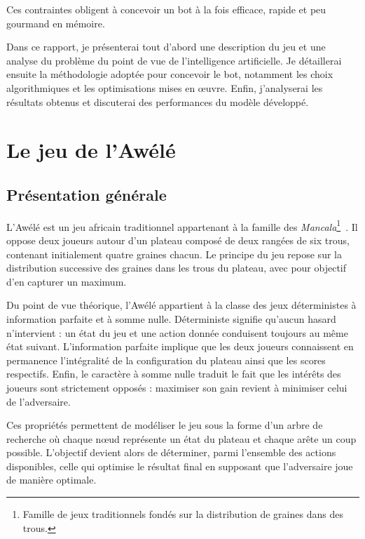 \documentclass[11pt,a4paper]{article}
\begin{document}
Ces contraintes obligent à concevoir un bot à la fois efficace, rapide et peu gourmand en mémoire.

Dans ce rapport, je présenterai tout d'abord une description du jeu et une analyse du problème du point de vue de l'intelligence 
artificielle. Je détaillerai ensuite la méthodologie adoptée pour concevoir le bot, notamment les choix algorithmiques et les optimisations
mises en œuvre. Enfin, j'analyserai les résultats obtenus et discuterai des performances du modèle développé.


\section{Le jeu de l'Awélé}

\subsection{Présentation générale}

L'Awélé est un jeu africain traditionnel appartenant à la famille des \textit{Mancala}\footnote{Famille de jeux traditionnels 
fondés sur la distribution de graines dans des trous.}~\cite{WikiOware}. Il oppose deux joueurs autour d'un plateau composé de deux rangées de six
trous, contenant initialement quatre graines chacun. Le principe du jeu repose sur la distribution successive des graines dans
les trous du plateau, avec pour objectif d'en capturer un maximum.

Du point de vue théorique, l'Awélé appartient à la classe des jeux déterministes à information parfaite et à somme nulle. 
Déterministe signifie qu'aucun hasard n'intervient : un état du jeu et une action donnée conduisent toujours au même état suivant.
L'information parfaite implique que les deux joueurs connaissent en permanence l'intégralité de la configuration du plateau ainsi
que les scores respectifs. Enfin, le caractère à somme nulle traduit le fait que les intérêts des joueurs sont strictement
opposés : maximiser son gain revient à minimiser celui de l'adversaire.

Ces propriétés permettent de modéliser le jeu sous la forme d'un arbre de recherche où chaque nœud représente un état du plateau 
et chaque arête un coup possible. L'objectif devient alors de déterminer, parmi l'ensemble des actions disponibles, celle qui
optimise le résultat final en supposant que l'adversaire joue de manière optimale.
\end{document}
